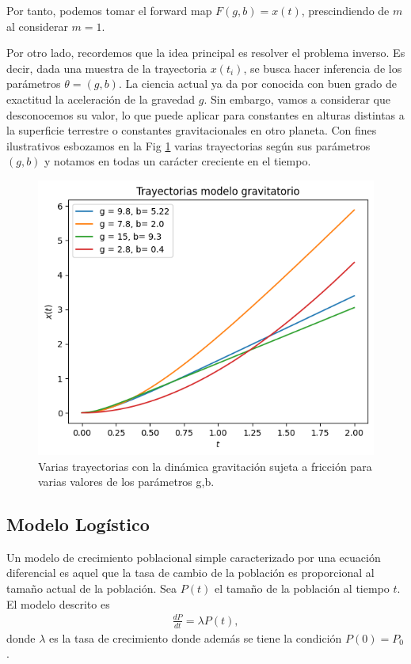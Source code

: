 Por tanto, podemos tomar el forward map $F(g,b) = x(t)$, prescindiendo de $m$ al considerar $m = 1$.

Por otro lado, recordemos que la idea principal es resolver el problema inverso. Es decir, dada una muestra de la trayectoria $x(t_i)$, se busca hacer inferencia de los parámetros $\theta = (g,b)$. La ciencia actual ya da por conocida con buen grado de exactitud la aceleración de la gravedad $g$. Sin embargo, vamos a considerar que desconocemos su valor, lo que puede aplicar para constantes en alturas distintas a la superficie terrestre o constantes gravitacionales en otro planeta. Con fines ilustrativos esbozamos en la Fig \ref{fig:trayectoria_gravedad} varias trayectorias según sus parámetros $(g,b)$ y notamos en todas un carácter creciente en el tiempo.

\begin{figure}
    \centering
    \includegraphics[width = 10 cm]{img/Trayectoria.png}
    \caption{Varias trayectorias con la dinámica gravitación sujeta a fricción para varias valores de los parámetros g,b.}
    \label{fig:trayectoria_gravedad}
\end{figure}

\subsection{Modelo Logístico}

Un modelo de crecimiento poblacional simple caracterizado por una ecuación diferencial es aquel que la tasa de cambio de la población es proporcional al tamaño actual de la población. Sea $P(t)$ el tamaño de la población al tiempo $t$. El modelo descrito es 
\begin{align}
    \frac{dP}{dt} = \lambda P(t),
    \label{3.1.2.01}
\end{align}
donde $\lambda$ es la tasa de crecimiento donde además se tiene la condición $P(0) = P_0$. 

